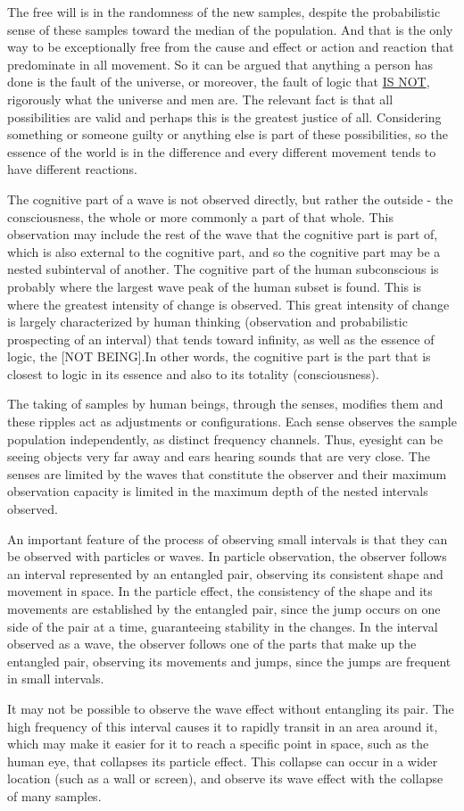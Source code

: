 The free will is in the randomness of the new samples, despite the probabilistic sense of these samples toward the median of the population. And that is the only way to be exceptionally free from the cause and effect or action and reaction that predominate in all movement. So it can be argued that anything a person has done is the fault of the universe, or moreover, the fault of logic that \underline{IS NOT}, rigorously what the universe and men are. The relevant fact is that all possibilities are valid and perhaps this is the greatest justice of all. Considering something or someone guilty or anything else is part of these possibilities, so the essence of the world is in the difference and every different movement tends to have different reactions.

The cognitive part of a wave is not observed directly, but rather the outside - the consciousness, the whole or more commonly a part of that whole. This observation may include the rest of the wave that the cognitive part is part of, which is also external to the cognitive part, and so the cognitive part may be a nested subinterval of another. The cognitive part of the human subconscious is probably where the largest wave peak of the human subset is found. This is where the greatest intensity of change is observed. This great intensity of change is largely characterized by human thinking (observation and probabilistic prospecting of an interval) that tends toward infinity, as well as the essence of logic, the [NOT BEING].In other words, the cognitive part is the part that is closest to logic in its essence and also to its totality (consciousness).

The taking of samples by human beings, through the senses, modifies them and these ripples act as adjustments or configurations. Each sense observes the sample population independently, as distinct frequency channels. Thus, eyesight can be seeing objects very far away and ears hearing sounds that are very close. The senses are limited by the waves that constitute the observer and their maximum observation capacity is limited in the maximum depth of the nested intervals observed.

An important feature of the process of observing small intervals is that they can be observed with particles or waves. In particle observation, the observer follows an interval represented by an entangled pair, observing its consistent shape and movement in space. In the particle effect, the consistency of the shape and its movements are established by the entangled pair, since the jump occurs on one side of the pair at a time, guaranteeing stability in the changes. In the interval observed as a wave, the observer follows one of the parts that make up the entangled pair, observing its movements and jumps, since the jumps are frequent in small intervals.

It may not be possible to observe the wave effect without entangling its pair. The high frequency of this interval causes it to rapidly transit in an area around it, which may make it easier for it to reach a specific point in space, such as the human eye, that collapses its particle effect. This collapse can occur in a wider location (such as a wall or screen), and observe its wave effect with the collapse of many samples.
